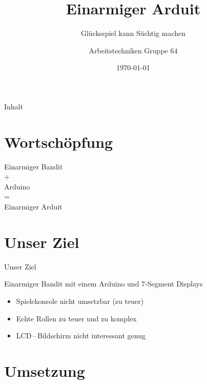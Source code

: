 \documentclass[mathserif,9pt]{beamer}
\title[Einarmiger Arduit]{Einarmiger Arduit}
\subtitle{Glücksspiel kann Süchtig machen}
\author{Arbeitstechniken Gruppe 64}
\institute{Franziska Massmann \; Jonas Nikolić \; Lukas Pensler \; Simon Struck}
\date{\today}
\begin{document}
    \titleframe        %

    \begin{frame}{Inhalt}
        \tableofcontents{}
    \end{frame}

    \section{Wortschöpfung}
    \begin{frame}{}
        \begin{block}{}
            \centering
            \Huge{
            Einarmiger Bandit \\
            + \\
            Arduino \\
            = \\
            Einarmiger Arduit}
        \end{block}
    \end{frame}

    \section{Unser Ziel}
    \begin{frame}{Unser Ziel}
        \begin{block}{Einarmiger Bandit mit einem Arduino und 7-Segment Displays}
            \begin{itemize}
                \item Spielekonsole nicht umsetzbar (zu teuer)
                \item Echte Rollen zu teuer und zu komplex
                \item LCD\,--\,Bildschirm nicht interessant genug
            \end{itemize}
        \end{block}
    \end{frame}

    \section{Umsetzung}
\end{document}
